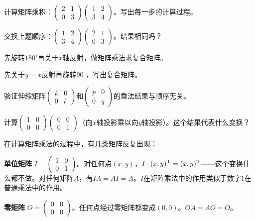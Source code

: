 \begin{exercise}
\item 计算矩阵乘积：$\begin{pmatrix}2&1\\0&3\end{pmatrix}\begin{pmatrix}1&2\\3&4\end{pmatrix}$。写出每一步的计算过程。
\item 交换上题顺序：$\begin{pmatrix}1&2\\3&4\end{pmatrix}\begin{pmatrix}2&1\\0&3\end{pmatrix}$。结果相同吗？
\item 先旋转$180^\circ$再关于$x$轴反射，做矩阵乘法求复合矩阵。
\item 先关于$y=x$反射再旋转$90^\circ$，写出复合矩阵。
\item 验证伸缩矩阵$\begin{pmatrix}k&0\\0&l\end{pmatrix}$和$\begin{pmatrix}p&0\\0&q\end{pmatrix}$的乘法结果与顺序无关。
\item 计算$\begin{pmatrix}1&0\\0&0\end{pmatrix}\begin{pmatrix}0&0\\0&1\end{pmatrix}$（向$x$轴投影乘以向$y$轴投影）。这个结果代表什么变换？
\end{exercise}


在计算矩阵乘法的过程中，有几类矩阵反复出现：

\textbf{单位矩阵} $I=\begin{pmatrix}1&0\\0&1\end{pmatrix}$。对任何点$(x,y)$，$I\cdot(x,y)^\text T=(x,y)^\text T$——这个变换什么都不做。对任何矩阵$A$，有$IA=AI=A$。$I$在矩阵乘法中的作用类似于数字$1$在普通乘法中的作用。

\textbf{零矩阵} $O=\begin{pmatrix}0&0\\0&0\end{pmatrix}$。任何点经过零矩阵都变成$(0,0)$。$OA=AO=O$。

